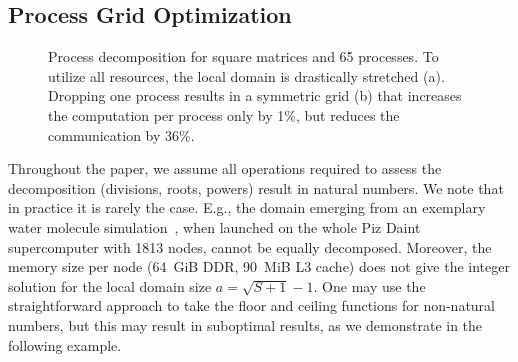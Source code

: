 \documentclass[sigplan,review,anonymous,10pt]{acmart}\settopmatter{printfolios=true,printccs=false,printacmref=false}
\begin{document}
\subsection{Process Grid Optimization}
\label{sec:decompArbitrary}
\begin{figure}[!tbp]
	\centering
	\hfill
	\caption{Process decomposition for square matrices and 65 
		processes. To utilize all resources, the local domain is 
		drastically stretched (a). Dropping one 
		process results in a symmetric grid (b) that 
		increases the computation per process only by 1\%, but reduces 
		the communication by 36\%.}
	\label{fig:decompProblem}
\end{figure}
Throughout the paper, we assume all operations required to 
assess the decomposition (divisions, roots, powers) result in natural 
numbers. We note that in practice it is rarely the case. E.g., the 
domain emerging from an exemplary 
water molecule simulation~\cite{joost}, when launched on the whole 
Piz Daint supercomputer with 1813 nodes, cannot be equally decomposed. 
Moreover, the memory size per 
node (64~GiB DDR, 90~MiB L3 cache) does not give the integer solution 
for the local domain size $a = \sqrt{S+1} -1$. One may use the straightforward 
approach to take  
the floor and ceiling
functions for non-natural numbers, but this may result in suboptimal 
results, as we demonstrate in the following example.
\end{document}
